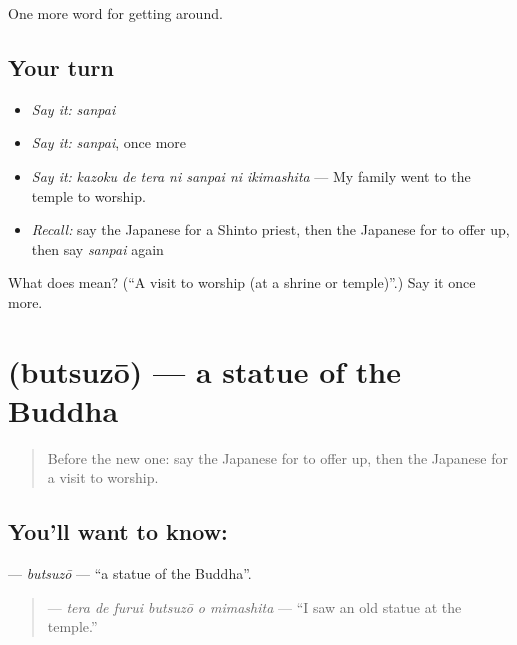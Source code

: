 \begin{grammarlens}[title={What you've built}]
One more word for getting around.
\end{grammarlens}

\subsection*{Your turn}
\begin{itemize}
\raggedright
  \item \emph{Say it:} \emph{sanpai}
  \item \emph{Say it:} \emph{sanpai}, once more
  \item \emph{Say it:} \emph{kazoku de tera ni sanpai ni ikimashita} — My family went to the temple to worship.
  \item \emph{Recall:} say the Japanese for a Shinto priest, then the Japanese for to offer up, then say \emph{sanpai} again
\end{itemize}

\begin{tcolorbox}[breakable,colback=teal!4,colframe=teal!35!black,title={Before you move on}]
What does  mean? (\textquotedblleft{}A visit to worship (at a shrine or temple)\textquotedblright{}.) Say it once more.
\end{tcolorbox}
\section[\texorpdfstring{\ja{ぶつぞう} (butsuzō)}{ぶつぞう (butsuzō)}]{ (butsuzō) — a statue of the Buddha}

\label{lesson:JA-C407-butsuzou}



\begin{quote}
Before the new one: say the Japanese for to offer up, then the Japanese for a visit to worship.
\end{quote}

\subsection*{You'll want to know: }
\textbf{} — \emph{butsuzō} — \textquotedblleft{}a statue of the Buddha\textquotedblright{}.

\begin{quote}
\textbf{   } — \emph{tera de furui butsuzō o mimashita} — \textquotedblleft{}I saw an old statue at the temple.\textquotedblright{}
\end{quote}

